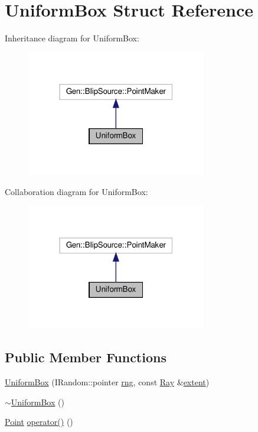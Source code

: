 \hypertarget{struct_uniform_box}{}\section{Uniform\+Box Struct Reference}
\label{struct_uniform_box}


Inheritance diagram for Uniform\+Box\+:
\nopagebreak
\begin{figure}[H]
\begin{center}
\leavevmode
\includegraphics[width=223pt]{struct_uniform_box__inherit__graph}
\end{center}
\end{figure}


Collaboration diagram for Uniform\+Box\+:
\nopagebreak
\begin{figure}[H]
\begin{center}
\leavevmode
\includegraphics[width=223pt]{struct_uniform_box__coll__graph}
\end{center}
\end{figure}
\subsection*{Public Member Functions}
\begin{DoxyCompactItemize}
\item 
\hyperlink{struct_uniform_box_a51defb5a1c6128d3442f9b019aa11865}{Uniform\+Box} (I\+Random\+::pointer \hyperlink{struct_uniform_box_a462f51835c09f3609f2912ecbe943659}{rng}, const \hyperlink{namespace_wire_cell_a3ab20d9b438feb7eb1ffaab9ba98af0c}{Ray} \&\hyperlink{struct_uniform_box_a9fb28af5ad857b4b381059fc77ab79c9}{extent})
\item 
\hyperlink{struct_uniform_box_a54e730b3de5f83e9f840e2c96b4abaf8}{$\sim$\+Uniform\+Box} ()
\item 
\hyperlink{namespace_wire_cell_ab2b2565fa6432efbb4513c14c988cda9}{Point} \hyperlink{struct_uniform_box_ae795d3a060cfa527f56b794d93e50084}{operator()} ()
\end{DoxyCompactItemize}
